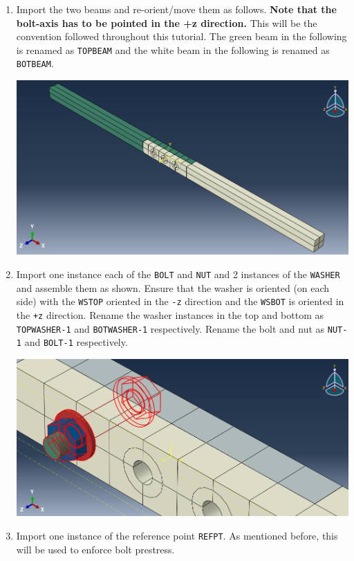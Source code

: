 \documentclass[11pt]{article}
\begin{document}
\begin{enumerate}
\item Import the two beams and re-orient/move them as follows.
\textbf{Note that the bolt-axis has to be pointed in the +z direction.}
This will be the convention followed throughout this tutorial.
The green beam in the following is renamed as \texttt{TOPBEAM} and the white beam in the following is renamed as \texttt{BOTBEAM}.
\begin{center}
\includegraphics[width=.9\linewidth]{./figs/asb1.png}
\end{center}
\item Import one instance each of the \texttt{BOLT} and \texttt{NUT} and 2 instances of the \texttt{WASHER} and assemble them as shown.
Ensure that the washer is oriented (on each side) with the \texttt{WSTOP} oriented in the \texttt{-z} direction and the \texttt{WSBOT} is oriented in the \texttt{+z} direction.
Rename the washer instances in the top and bottom as \texttt{TOPWASHER-1} and \texttt{BOTWASHER-1} respectively.
Rename the bolt and nut as \texttt{NUT-1} and \texttt{BOLT-1} respectively.
\begin{center}
\includegraphics[width=.9\linewidth]{./figs/asbwn.png}
\end{center}
\item Import one instance of the reference point \texttt{REFPT}.
As mentioned before, this will be used to enforce bolt prestress.

\end{enumerate}
\end{document}
